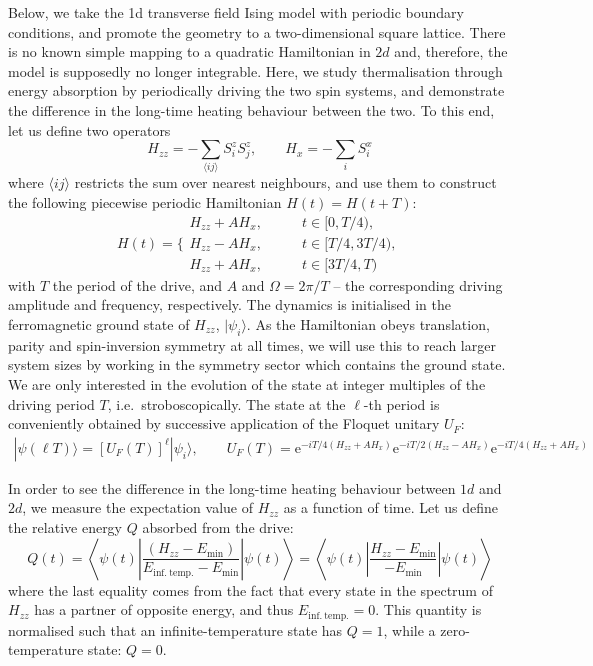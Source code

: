 \documentclass{SciPost}
\newcommand\0{\scalebox{-1}[1]{0}}
\begin{document}
Below, we take the 1d transverse field Ising model with periodic boundary conditions, and promote the geometry to a two-dimensional square lattice. There is no known simple mapping to a quadratic Hamiltonian in $2d$ and, therefore, the model is supposedly no longer integrable. Here, we study thermalisation through energy absorption by periodically driving the two spin systems, and demonstrate the difference in the long-time heating behaviour between the two. To this end, let us define two operators
\begin{equation}
H_{zz} = -\sum_{\langle ij\rangle} S^z_iS^z_{j}, \qquad H_{x} = -\sum_{i}S^x_i
\end{equation}
where $\langle ij\rangle$ restricts the sum over nearest neighbours, and use them to construct the following piecewise periodic Hamiltonian $H(t)=H(t+T)$:
\begin{equation}
H(t)=\Bigg\{ \begin{array}{cc}
H_{zz} +AH_x,& \qquad t\in[0,T/4), \\
H_{zz} -AH_x,& \qquad t\in[T/4,3T/4),\\
H_{zz} +AH_x,& \qquad t\in[3T/4,T)
\end{array}
\end{equation}
with $T$ the period of the drive, and $A$ and $\Omega=2\pi/T$ -- the corresponding driving amplitude and frequency, respectively. The dynamics is initialised in the ferromagnetic ground state of $H_{zz}$, $|\psi_i\rangle$. As the Hamiltonian obeys translation, parity and spin-inversion symmetry at all times, we will use this to reach larger system sizes by working in the symmetry sector which contains the ground state. We are only interested in the evolution of the state at integer multiples of the driving period $T$, i.e.~stroboscopically. The state at the $\ell$-th period is conveniently obtained by successive application of the Floquet unitary $U_F$:
\begin{eqnarray}
|\psi(\ell T)\rangle = [U_F(T)]^\ell|\psi_i\rangle, \qquad U_F(T)=\mathrm e^{-iT/4(H_{zz} +AH_x)}
\mathrm e^{-iT/2(H_{zz} -AH_x)}\mathrm e^{-iT/4(H_{zz} +AH_x)}
\end{eqnarray} 

In order to see the difference in the long-time heating behaviour between $1d$ and $2d$, we measure the expectation value of $H_{zz}$ as a function of time. Let us define the relative energy $Q$ absorbed from the drive:
\begin{equation}
Q(t) =\left\langle\psi(t)\left\vert\frac{ \left(H_{zz}-E_\mathrm{min}\right)}{E_\mathrm{inf.~temp.}-E_\mathrm{min}}\right\vert\psi(t)\right\rangle=\left\langle\psi(t)\left\vert\frac{ H_{zz}-E_\mathrm{min}}{-E_\mathrm{min}}\right\vert\psi(t)\right\rangle
\end{equation}
where the last equality comes from the fact that every state in the spectrum of $H_{zz}$ has a partner of opposite energy, and thus $E_\mathrm{inf.~temp.}=0$. This quantity is normalised such that an infinite-temperature state has $Q=1$, while a zero-temperature state: $Q=0$. 
\end{document}
